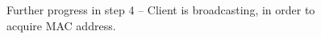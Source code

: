 \begin{figure}[h!]
  \begin{center}
    \centerline{
      }
    \caption{Further progress in step 4 -- Client is broadcasting, in
      order to acquire MAC address.}
    \label{fig:sbs-collect-broadcast} 
  \end{center}
\end{figure}

